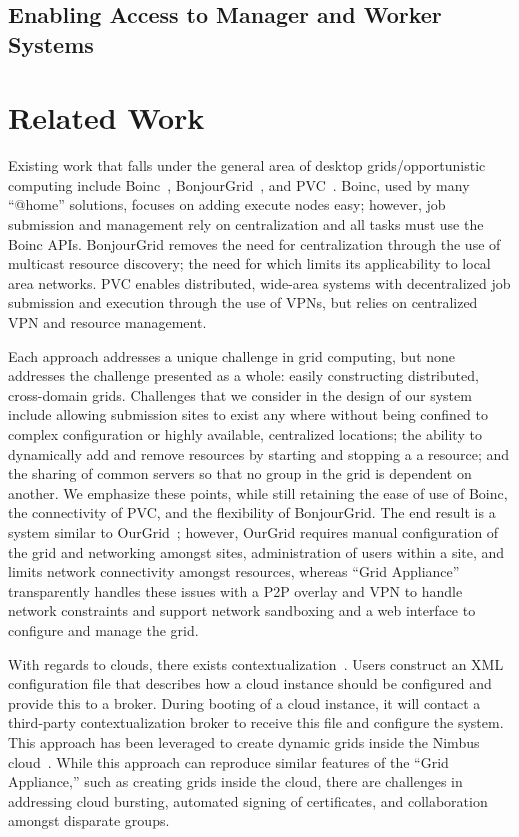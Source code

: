 \documentclass[twocolumn]{svjour3}
\begin{document}
\subsection{Enabling Access to Manager and Worker Systems}

\section{Related Work}
\label{related_work}

Existing work that falls under the general area of desktop grids/opportunistic
computing include Boinc~\cite{boinc}, BonjourGrid~\cite{bonjourgrid}, and
PVC~\cite{pvc}.  Boinc, used by many ``@home'' solutions, focuses on adding
execute nodes easy; however, job submission and management rely on
centralization and all tasks must use the Boinc APIs.  BonjourGrid removes the
need for centralization through the use of multicast resource discovery; the
need for which limits its applicability to local area networks.  PVC enables
distributed, wide-area systems with decentralized job submission and execution
through the use of VPNs, but relies on centralized VPN and resource management.

Each approach addresses a unique challenge in grid computing, but none
addresses the challenge presented as a whole: easily constructing distributed,
cross-domain grids.  Challenges that we consider in the design of our system
include allowing submission sites to exist any where without being confined to
complex configuration or highly available, centralized locations; the ability
to dynamically add and remove resources by starting and stopping a a resource;
and the sharing of common servers so that no group in the grid is dependent on
another.  We emphasize these points, while still retaining the ease of use of
Boinc, the connectivity of PVC, and the flexibility of BonjourGrid.  The end
result is a system similar to OurGrid~\cite{ourgrid}; however, OurGrid requires
manual configuration of the grid and networking amongst sites, administration
of users within a site, and limits network connectivity amongst resources,
whereas ``Grid Appliance'' transparently handles these issues with a P2P
overlay and VPN to handle network constraints and support network sandboxing
and a web interface to configure and manage the grid.

With regards to clouds, there exists contextualization~\cite{context}.  Users
construct an XML configuration file that describes how a cloud instance should
be configured and provide this to a broker.  During booting of a cloud
instance, it will contact a third-party contextualization broker to receive
this file and configure the system.  This approach has been leveraged to create
dynamic grids inside the Nimbus cloud~\cite{alien_grid}.  While this approach
can reproduce similar features of the ``Grid Appliance,'' such as creating
grids inside the cloud, there are challenges in addressing cloud bursting,
automated signing of certificates, and collaboration amongst disparate groups.
\end{document}
